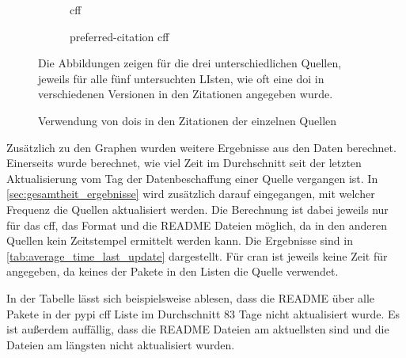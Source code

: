 \begin{figure}
    \begin{subfigure}{.5\textwidth}
        \centering
        
        \caption{\gls{cff}}
        \label{fig:cff_doi}
    \end{subfigure}%
    \begin{subfigure}{.5\textwidth}
        \centering
        
        \caption{\glqq preferred-citation\grqq{} \gls{cff}}
        \label{fig:preferred_citation_doi}
    \end{subfigure}
    \centering
    \begin{subfigure}{.5\textwidth}
        \centering
        
        \caption{}
        \label{fig:bib_doi}
    \end{subfigure}
    \caption{Verwendung von \gls{doi}s in den Zitationen der einzelnen Quellen}
    \label{fig:doi}
    \small
    \raggedright
    Die Abbildungen zeigen für die drei unterschiedlichen Quellen, jeweils für alle fünf untersuchten LIsten, wie oft eine \gls{doi} in verschiedenen Versionen in den Zitationen angegeben wurde.
\end{figure}

Zusätzlich zu den Graphen wurden weitere Ergebnisse aus den Daten berechnet.
Einerseits wurde berechnet, wie viel Zeit im Durchschnitt seit der letzten Aktualisierung vom Tag der Datenbeschaffung einer Quelle vergangen ist.
In \autoref{sec:gesamtheit_ergebnisse} wird zusätzlich darauf eingegangen, mit welcher Frequenz die Quellen aktualisiert werden.
Die Berechnung ist dabei jeweils nur für das \gls{cff}, das  Format und die README Dateien möglich, da in den anderen Quellen kein Zeitstempel ermittelt werden kann.
Die Ergebnisse sind in \autoref{tab:average_time_last_update} dargestellt.
Für \gls{cran} ist jeweils keine Zeit für  angegeben, da keines der Pakete in den Listen die Quelle verwendet.

In der Tabelle lässt sich beispielsweise ablesen, dass die README über alle Pakete in der \gls{pypi} \gls{cff} Liste im Durchschnitt 83 Tage nicht aktualisiert wurde.
Es ist außerdem auffällig, dass die README Dateien am aktuellsten sind und die  Dateien am längsten nicht aktualisiert wurden.

